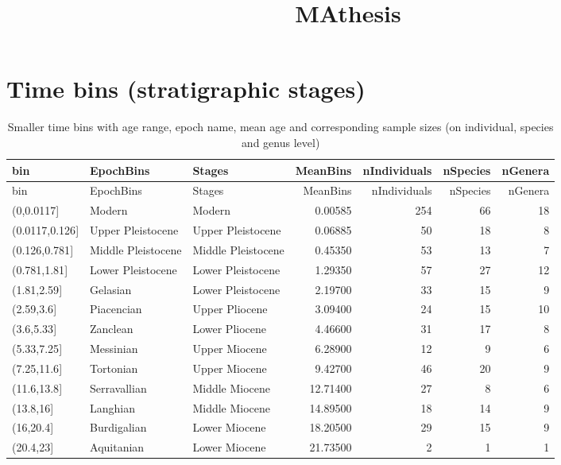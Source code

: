 \documentclass[]{article}
\title{MAthesis}
\author{}
\date{}
\begin{document}
\maketitle

{
\setcounter{tocdepth}{2}
\tableofcontents
}
\section{Time bins (stratigraphic
stages)}\label{time-bins-stratigraphic-stages}

\begin{longtable}[]{@{}lllrrrr@{}}
\caption{Smaller time bins with age range, epoch name, mean age and
corresponding sample sizes (on individual, species and genus
level)}\tabularnewline
\toprule
bin & EpochBins & Stages & MeanBins & nIndividuals & nSpecies &
nGenera\tabularnewline
\midrule
\endfirsthead
\toprule
bin & EpochBins & Stages & MeanBins & nIndividuals & nSpecies &
nGenera\tabularnewline
\midrule
\endhead
(0,0.0117{]} & Modern & Modern & 0.00585 & 254 & 66 & 18\tabularnewline
(0.0117,0.126{]} & Upper Pleistocene & Upper Pleistocene & 0.06885 & 50
& 18 & 8\tabularnewline
(0.126,0.781{]} & Middle Pleistocene & Middle Pleistocene & 0.45350 & 53
& 13 & 7\tabularnewline
(0.781,1.81{]} & Lower Pleistocene & Lower Pleistocene & 1.29350 & 57 &
27 & 12\tabularnewline
(1.81,2.59{]} & Gelasian & Lower Pleistocene & 2.19700 & 33 & 15 &
9\tabularnewline
(2.59,3.6{]} & Piacencian & Upper Pliocene & 3.09400 & 24 & 15 &
10\tabularnewline
(3.6,5.33{]} & Zanclean & Lower Pliocene & 4.46600 & 31 & 17 &
8\tabularnewline
(5.33,7.25{]} & Messinian & Upper Miocene & 6.28900 & 12 & 9 &
6\tabularnewline
(7.25,11.6{]} & Tortonian & Upper Miocene & 9.42700 & 46 & 20 &
9\tabularnewline
(11.6,13.8{]} & Serravallian & Middle Miocene & 12.71400 & 27 & 8 &
6\tabularnewline
(13.8,16{]} & Langhian & Middle Miocene & 14.89500 & 18 & 14 &
9\tabularnewline
(16,20.4{]} & Burdigalian & Lower Miocene & 18.20500 & 29 & 15 &
9\tabularnewline
(20.4,23{]} & Aquitanian & Lower Miocene & 21.73500 & 2 & 1 &
1\tabularnewline
\bottomrule
\end{longtable}
\end{document}
